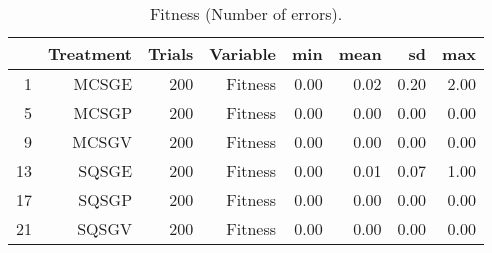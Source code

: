 \begin{table}[ht]
\centering
\begin{tabular}{rrrrrrrr}
  \hline
 & Treatment & Trials & Variable & min & mean & sd & max \\ 
  \hline
1 & MCSGE & 200 & Fitness & 0.00 & 0.02 & 0.20 & 2.00 \\ 
  5 & MCSGP & 200 & Fitness & 0.00 & 0.00 & 0.00 & 0.00 \\ 
  9 & MCSGV & 200 & Fitness & 0.00 & 0.00 & 0.00 & 0.00 \\ 
  13 & SQSGE & 200 & Fitness & 0.00 & 0.01 & 0.07 & 1.00 \\ 
  17 & SQSGP & 200 & Fitness & 0.00 & 0.00 & 0.00 & 0.00 \\ 
  21 & SQSGV & 200 & Fitness & 0.00 & 0.00 & 0.00 & 0.00 \\ 
   \hline
\end{tabular}
\caption{Fitness (Number of errors).} 
\end{table}
